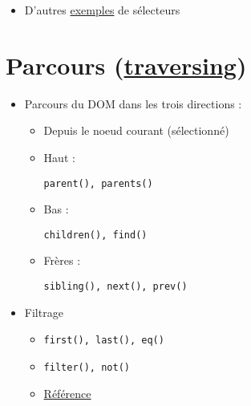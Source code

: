 \begin{otherlanguage}{english}

\begin{Shaded}
\begin{Highlighting}[]
\AttributeTok{$}\NormalTok{(}\NormalTok{)}\OperatorTok{;}
\end{Highlighting}
\end{Shaded}

\end{otherlanguage}

\begin{itemize}
\tightlist
\item
  D'autres
  \href{http://www.w3schools.com/jquery/jquery_selectors.asp}{exemples}
  de sélecteurs
\end{itemize}

\hypertarget{parcours-traversing3}{%
\section{\texorpdfstring{Parcours
(\href{http://www.w3schools.com/jquery/jquery_traversing.asp}{traversing})}{Parcours (traversing)}}\label{parcours-traversing3}}

\begin{itemize}
\tightlist
\item
  Parcours du DOM dans les trois directions :

  \begin{itemize}
  \tightlist
  \item
    Depuis le noeud courant (sélectionné)
  \item
    Haut :
    \begin{otherlanguage}{english}\texttt{parent(),\ parents()}\end{otherlanguage}
  \item
    Bas :
    \begin{otherlanguage}{english}\texttt{children(),\ find()}\end{otherlanguage}
  \item
    Frères :
    \begin{otherlanguage}{english}\texttt{sibling(),\ next(),\ prev()}\end{otherlanguage}
  \end{itemize}
\item
  Filtrage

  \begin{itemize}
  \tightlist
  \item
    \begin{otherlanguage}{english}\texttt{first(),\ last(),\ eq()}\end{otherlanguage}
  \item
    \begin{otherlanguage}{english}\texttt{filter(),\ not()}\end{otherlanguage}
  \item
    \href{http://www.w3schools.com/jquery/jquery_ref_traversing.asp}{Référence}
  \end{itemize}
\end{itemize}

